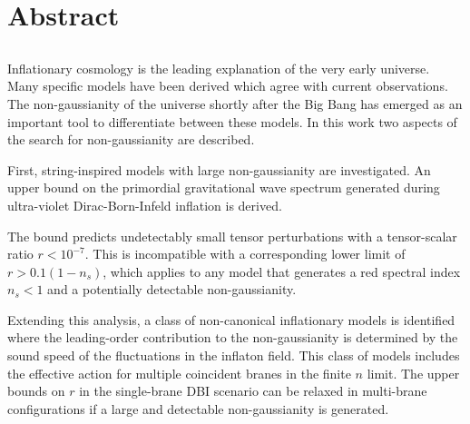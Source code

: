\renewcommand{\CVSrevision}{\version$Id: abstract.tex,v 1.9 2009/08/17 13:13:02 ith Exp $}
% 
% 
\chapter*{Abstract}
\label{ch:abstract}
\section*{}
\singlespacing
Inflationary cosmology is the leading explanation of the very early universe. 
Many specific models have been derived which agree with current observations.
The non-gaussianity of the universe shortly after the Big Bang has emerged as
an important tool to differentiate between these models. In this work
two aspects of the search for non-gaussianity are described.

First, string-inspired models with large non-gaussianity are investigated.
An upper bound on the primordial gravitational wave spectrum
generated during ultra-violet Dirac-Born-Infeld inflation is derived. 

The bound predicts
undetectably small tensor perturbations with a tensor-scalar ratio $r <
10^{-7}$. 
This is incompatible with a corresponding lower limit of $r > 0.1
(1-n_s)$, which applies to any model that generates a red spectral index $n_s
<1$ and a potentially detectable non-gaussianity.

Extending this analysis, a class of non-canonical inflationary models is
identified where the leading-order contribution to the non-gaussianity is
determined by the sound speed of the fluctuations in
the inflaton field. 
This class of models includes the effective action for
multiple coincident branes in the finite $n$ limit. 
The upper bounds on $r$ in the single-brane
DBI scenario can be relaxed in multi-brane configurations if a large and
detectable non-gaussianity is generated. 

